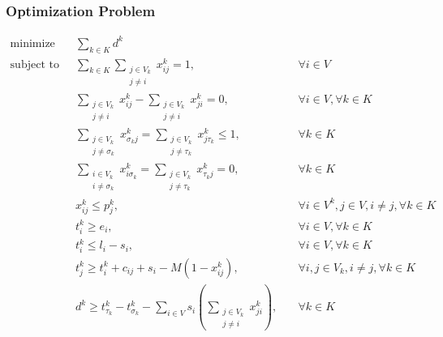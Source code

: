 \documentclass[a4paper]{article}
\begin{document}
\subsubsection*{Optimization Problem}

\begin{align}
\text{minimize} \quad & \sum_{k \in K} d^k
&& \tag{V1} \label{eq:MinimizeDowntime} \\
\text{subject to}\quad
& \sum_{k \in K} \sum_{\substack{j \in V_k \\ j \neq i}} x_{ij}^k = 1, &\quad \forall i \in V \tag{V2} \label{eq:UniqueVisit} \\
& \sum_{\substack{j \in V_k \\ j \neq i}} x_{ij}^k - \sum_{\substack{j \in V_k \\ j \neq i}} x_{ji}^k = 0, &\quad \forall i \in V, \forall k \in K \tag{V3} \label{eq:FlowConservation} \\
& \sum_{\substack{j \in V_k \\ j \neq \sigma_k}} x_{\sigma_k j}^k = \sum_{\substack{j \in V_k \\ j \neq \tau_k}} x_{j \tau_k}^k \leq 1, &\quad \forall k \in K \tag{V4} \label{eq:RouteCompletion} \\
& \sum_{\substack{i \in V_k \\ i \neq \sigma_k}} x_{i\sigma_k}^k = \sum_{\substack{j \in V_k \\ j \neq \tau_k}} x_{\tau_k j}^k = 0, &\quad \forall k \in K \tag{V5} \label{eq:InvalidArcPrevention} \\
& x_{ij}^k \le p_j^k, &\quad \forall i \in V^k, j \in V, i \neq j, \forall k \in K \tag{V6} \label{eq:Qualification} \\
& t_i^k \ge e_i, &\quad \forall i \in V, \forall k \in K \tag{V7} \label{eq:EarliestArrival} \\
& t_i^k \le l_i - s_i, &\quad \forall i \in V, \forall k \in K \tag{V8} \label{eq:LatestArrival} \\
& t_j^k \ge t_i^k + c_{ij} + s_i - M(1 - x_{ij}^k), &\quad \forall i, j \in V_k, i \neq j, \forall k \in K \tag{V9} \label{eq:TemporalFeasibility} \\
& d^k \ge t_{\tau_k}^k - t_{\sigma_k}^k - \sum_{i \in V} s_i (\sum_{\substack{j \in V_k \\ j \neq i}} x_{ji}^k), &\quad \forall k \in K \tag{V10} \label{eq:DowntimeDefinition}
\end{align}
\end{document}
